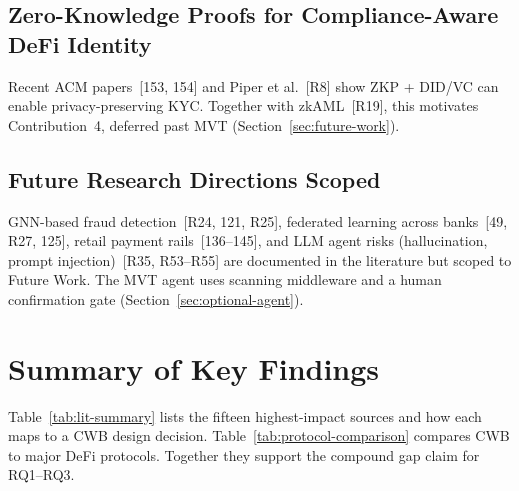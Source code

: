 \documentclass[12pt,a4paper]{report}
\begin{document}
\subsection{Zero-Knowledge Proofs for Compliance-Aware DeFi Identity}
\label{sec:lit-zkp-defi}

Recent ACM papers~[153, 154] and Piper et al.~[R8] show ZKP + DID/VC can enable privacy-preserving KYC. Together with zkAML~[R19], this motivates Contribution~4, deferred past MVT (Section~\ref{sec:future-work}).

\subsection{Future Research Directions Scoped}
\label{sec:lit-gnn}
\label{sec:lit-fl}
\label{sec:lit-retail-payments}
\label{sec:lit-llm}
\label{sec:harness-lit}

GNN-based fraud detection~[R24, 121, R25], federated learning across banks~[49, R27, 125], retail payment rails~[136--145], and LLM agent risks (hallucination, prompt injection)~[R35, R53--R55] are documented in the literature but scoped to Future Work. The MVT agent uses scanning middleware and a human confirmation gate (Section~\ref{sec:optional-agent}).

\section{Summary of Key Findings}
\label{sec:comparative-protocol}

Table~\ref{tab:lit-summary} lists the fifteen highest-impact sources and how each maps to a CWB design decision. Table~\ref{tab:protocol-comparison} compares CWB to major DeFi protocols. Together they support the compound gap claim for RQ1--RQ3.
\end{document}
